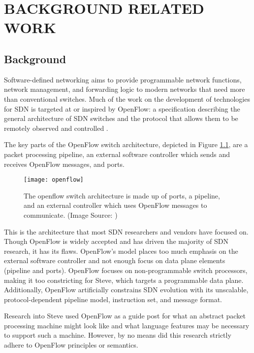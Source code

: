 \chapter{BACKGROUND RELATED WORK}
\label{ch:related}

\section{Background}
\label{rel:openflow}

Software-defined networking aims to provide programmable network functions,
network management, and forwarding logic to modern networks that need more
than conventional switches.
Much of the work on the development of technologies for SDN is targeted at or 
inspired by OpenFlow: a specification describing the general architecture of SDN 
switches and the protocol that allows them to be remotely observed and controlled 
\cite{openflow_spec}. 

The key parts of the OpenFlow switch architecture, depicted in Figure \ref{fg:openflow_switch}, are a packet 
processing pipeline, an external software controller which sends and receives
OpenFlow messages, and ports. 

\begin{figure}[ht]
\centering
\texttt{[image: openflow]}
\caption{The openflow switch architecture is made up of ports, a pipeline,
and an external controller which uses OpenFlow messages to communicate. (Image Source: \cite{openflow_spec})}
\label{fg:openflow_switch}
\end{figure}

This is the architecture that most SDN researchers and vendors have focused on.
Though OpenFlow is widely accepted and has driven the majority of SDN research,
it has its flaws.
OpenFlow's model places too much emphasis on the external software controller
and not enough focus on data plane elements (pipeline and ports).
OpenFlow focuses on non-programmable switch processors, making it too
constricting for Steve, which targets a programmable data plane.
Additionally, OpenFlow artificially constrains SDN evolution with its
unscalable, protocol-dependent pipeline model, instruction set, and message format.

Research into Steve used OpenFlow as a guide post for what an abstract
packet processing machine might look like and what language features may be
necessary to support such a machine. However, by no means did this research
strictly adhere to OpenFlow principles or semantics.

